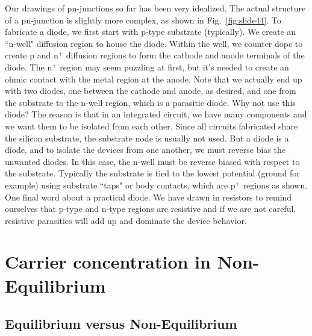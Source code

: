 Our drawings of pn-junctions so far has been very idealized.  The actual structure of a pn-junction is slightly more complex, as shown in Fig.~\ref{fig:slide44}.  To fabricate a diode, we first start with p-type substrate (typically).  We create an ``n-well" diffusion region  to house the diode.  Within the well, we counter dope to create p and n$^+$ diffusion regions to form  the cathode and anode terminals of the diode.  The n$^+$ region may seem puzzling at first, but it's needed to create an ohmic contact with the metal region at the anode.  Note that we actually end up with two diodes, one between the cathode and anode, as desired, and one from the substrate to the n-well region, which is a parasitic diode.  Why not use this diode?  The reason is that in an integrated circuit, we have many components and we want them to be isolated from each other.  Since all circuits fabricated share the silicon substrate, the substrate node is usually not used.  But a diode is a diode, and to isolate the devices from one another, we must reverse bias the unwanted diodes.  In this case, the n-well must be reverse biased with respect to the substrate.  Typically the substrate is tied to the lowest potential (ground for example) using substrate ``taps" or body contacts, which are p$^+$ regions as shown.  One final word about a practical diode.  We have drawn in resistors to remind ourselves that p-type and n-type regions are resistive and if we are not careful, resistive parasitics will add up and dominate the device behavior.  
 


\section{Carrier concentration in Non-Equilibrium}



\subsection{Equilibrium versus Non-Equilibrium}

